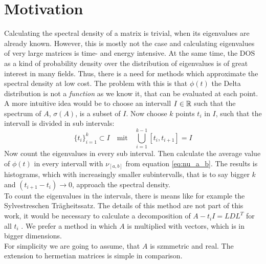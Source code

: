 \section{Motivation}
Calculating the spectral density of a matrix is trivial, when its eigenvalues are already known.
However, this is mostly not the case and calculating eigenvalues of very large matrices is time- and energy intensive.
At the same time, the DOS as a kind of probability density over the distribution of eigenvalues is of great interest in many fields.
Thus, there is a need for methods which approximate the spectral density at low cost.
The problem with this is that $\phi(t)$ the Delta distribution is not a \emph{function} as we know it,
that can be evaluated at each point.\\
A more intuitive idea would be to choose an intervall $I \in \mathbb{R}$ such that the spectrum of $A$, $\sigma(A)$, is a subset of $I$.
Now choose $k$ points $t_i$ in $I$, such that the intervall is divided in sub intervals:
$$\{t_i\}_{i = 1}^k \subset I \quad \text{mit} \quad \bigcup_{i = 1}^{k - 1} [t_i, t_{i+1}] = I$$
Now count the eigenvalues in every sub interval.
Then calculate the average value of $\phi(t)$ in every intervall with $\nu_{[a, b]}$ from equation \ref{eq:nu_a_b}.
The results is histograms, which with increasingly smaller subintervalls, that is to say bigger $k$ and $(t_{i+1} - t_i) \longrightarrow 0$, approach the spectral density.\\
To count the eigenvalues in the intervals, there is means like for example the Sylvestreschen Trägheitssatz.
The details of this method are not part of this work,
it would be necessary to calculate a decomposition of $A - t_i I = LDL^T$ for all $t_i$ \cite{golubvanloan}.
We prefer a method in which $A$ is multiplied with vectors, which is in bigger dimensions.\\
For simplicity we are going to assume, that $A$ is szmmetric and real.
The extension to hermetian matrices is simple in comparison.